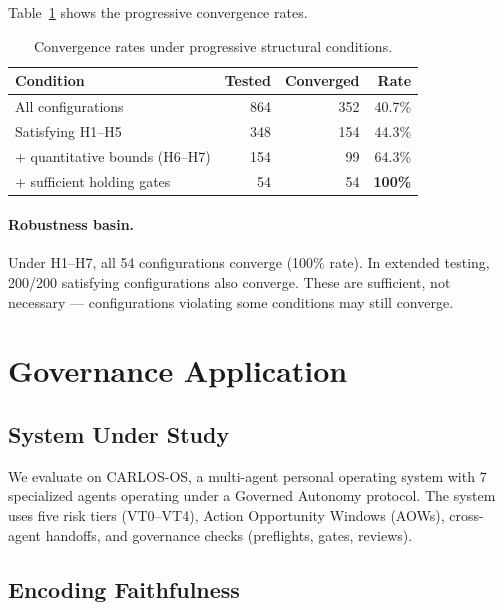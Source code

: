\documentclass[sigconf,nonacm]{acmart}
\begin{document}
Table~\ref{tab:sweep} shows the progressive convergence rates.

\begin{table}[t]
  \caption{Convergence rates under progressive structural conditions.}\label{tab:sweep}
  \small
  \begin{tabular}{@{}lrrr@{}}
    \toprule
    \textbf{Condition} & \textbf{Tested} & \textbf{Converged} & \textbf{Rate} \\
    \midrule
    All configurations & 864 & 352 & 40.7\% \\
    Satisfying H1--H5 & 348 & 154 & 44.3\% \\
    + quantitative bounds (H6--H7) & 154 & 99 & 64.3\% \\
    + sufficient holding gates & 54 & 54 & \textbf{100\%} \\
    \bottomrule
  \end{tabular}
\end{table}

\paragraph{Robustness basin.}
Under H1--H7, all 54 configurations converge (100\% rate). In
extended testing, 200/200 satisfying configurations also converge.
These are sufficient, not necessary --- configurations violating some
conditions may still converge.


\section{Governance Application}\label{sec:eval}

\subsection{System Under Study}

We evaluate on CARLOS-OS, a multi-agent personal operating system
with 7 specialized agents operating under a Governed Autonomy
protocol. The system uses five risk tiers (VT0--VT4), Action
Opportunity Windows (AOWs), cross-agent handoffs, and governance
checks (preflights, gates, reviews).

\subsection{Encoding Faithfulness}
\end{document}
